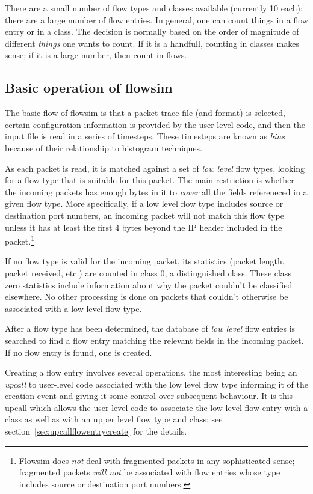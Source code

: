 \documentclass{article}
\begin{document}
There are a small number of flow types and classes available (currently
10 each); there are a large number of flow entries.  In general, one
can count things in a flow entry or in a class.  The decision is
normally based on the order of magnitude of different \emph{things} one
wants to count.  If it is a handfull, counting in classes makes sense;
if it is a large number, then count in flows.
\subsection{Basic operation of flowsim}

The basic flow of flowsim is that a packet trace file (and format) is
selected, certain configuration information is provided by the
user-level code, and
then the input file is read in a series of timesteps.  These
timesteps are known as \emph{bins} because of their relationship to
histogram techniques.

As each packet is read, it is matched against a set of \emph{low level}
flow types, looking for a flow type that is suitable for this packet.
The main restriction is whether the incoming packets has enough bytes
in it to \emph{cover} all the fields refereneced in a given flow type.
More specifically, if a low level flow type includes source or
destination port numbers, an incoming packet will not match this flow
type unless it has at least the first 4 bytes beyond the IP header
included in the packet.\footnote{
Flowsim does \emph{not} deal with fragmented packets in any
sophisticated sense; fragmented packets \emph{will not} be associated
with flow entries whose type includes source or destination port
numbers.}

If no flow type is valid for the incoming packet, its statistics
(packet length, packet received, etc.) are counted in class 0, a
distinguished class.  These class zero statistics include information
about why the packet couldn't be classified elsewhere.  No other
processing is done on packets that couldn't otherwise be associated
with a low level flow type.

After a flow type has been determined, the database of \emph{low level}
flow entries is searched to find a flow entry matching the relevant
fields in the incoming packet.  If no flow entry is found, one is
created.

Creating a flow entry involves several operations, the most interesting
being an \emph{upcall} to user-level code associated with the low level
flow type informing it of the creation event and giving it some control
over subsequent behaviour.  It is this upcall which allows the
user-level code to associate the low-level flow entry with a class as
well as with an upper level flow type and class; see
section~\ref{sec:upcallflowentrycreate} for the details.
\end{document}
